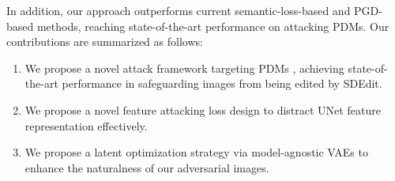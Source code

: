 In addition, our approach outperforms current semantic-loss-based and PGD-based methods, reaching state-of-the-art performance on attacking PDMs. Our contributions are summarized as follows:

\begin{enumerate}
    \item We propose a novel attack framework targeting PDMs
    , achieving state-of-the-art performance in safeguarding images from being edited by SDEdit.
    \item  We propose a novel feature attacking loss design to distract UNet feature representation effectively.
    \item We propose a latent optimization strategy via model-agnostic VAEs to enhance the naturalness of our adversarial images.
\end{enumerate}
